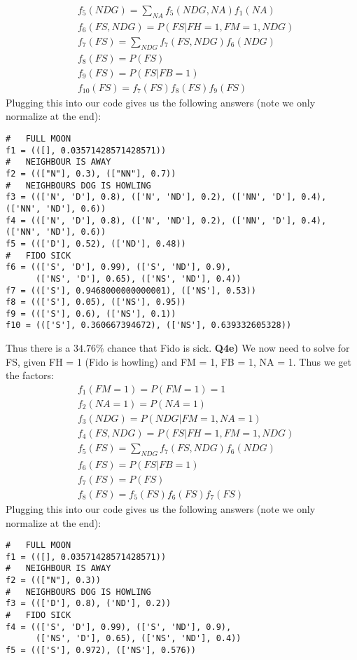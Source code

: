 \documentclass{article}
\begin{document}
\begin{titlepage}
\begin{align*}
& f_5(NDG) = \sum_{NA} f_5(NDG, NA)f_1(NA) \\
& f_6(FS, NDG) = P(FS | FH = 1, FM = 1, NDG) \\
& f_7(FS) = \sum_{NDG} f_7(FS, NDG)f_6(NDG)  \\
& f_8(FS) = P(FS) \\
& f_9(FS) = P(FS |FB = 1) \\
& f_10(FS) = f_7(FS)f_8(FS)f_9(FS)
\end{align*}
Plugging this into our code gives us the following answers (note we only normalize at the end):
\begin{lstlisting}
#   FULL MOON
f1 = (([], 0.03571428571428571))
#   NEIGHBOUR IS AWAY
f2 = ((["N"], 0.3), (["NN"], 0.7))
#   NEIGHBOURS DOG IS HOWLING
f3 = ((['N', 'D'], 0.8), (['N', 'ND'], 0.2), (['NN', 'D'], 0.4), (['NN', 'ND'], 0.6))
f4 = ((['N', 'D'], 0.8), (['N', 'ND'], 0.2), (['NN', 'D'], 0.4), (['NN', 'ND'], 0.6))
f5 = ((['D'], 0.52), (['ND'], 0.48))
#   FIDO SICK
f6 = ((['S', 'D'], 0.99), (['S', 'ND'], 0.9), 
	  (['NS', 'D'], 0.65), (['NS', 'ND'], 0.4))
f7 = ((['S'], 0.9468000000000001), (['NS'], 0.53))
f8 = ((['S'], 0.05), (['NS'], 0.95))
f9 = ((['S'], 0.6), (['NS'], 0.1))
f10 = ((['S'], 0.360667394672), (['NS'], 0.639332605328))
\end{lstlisting}
Thus there is a $34.76\%$ chance that Fido is sick.
\newpage
\textbf{Q4e)} We now need to solve for FS, given FH = 1 (Fido is howling) and FM = 1, FB = 1, NA = 1. Thus we get the factors:
\begin{align*}
& f_1(FM = 1) = P(FM = 1) = 1 \\ 
& f_2(NA = 1) = P(NA = 1) \\
& f_3(NDG) = P(NDG | FM = 1, NA = 1) \\
& f_4(FS, NDG) = P(FS | FH = 1, FM = 1, NDG) \\
& f_5(FS) = \sum_{NDG} f_7(FS, NDG)f_6(NDG)  \\
& f_6(FS) = P(FS |FB = 1) \\
& f_7(FS) = P(FS) \\
& f_8(FS) = f_5(FS)f_6(FS)f_7(FS)
\end{align*}
Plugging this into our code gives us the following answers (note we only normalize at the end):
\begin{lstlisting}
#   FULL MOON
f1 = (([], 0.03571428571428571))
#   NEIGHBOUR IS AWAY
f2 = ((["N"], 0.3))
#   NEIGHBOURS DOG IS HOWLING
f3 = ((['D'], 0.8), ('ND'], 0.2))
#   FIDO SICK
f4 = ((['S', 'D'], 0.99), (['S', 'ND'], 0.9), 
	  (['NS', 'D'], 0.65), (['NS', 'ND'], 0.4))
f5 = ((['S'], 0.972), (['NS'], 0.576))

\end{lstlisting}
\end{titlepage}
\end{document}

